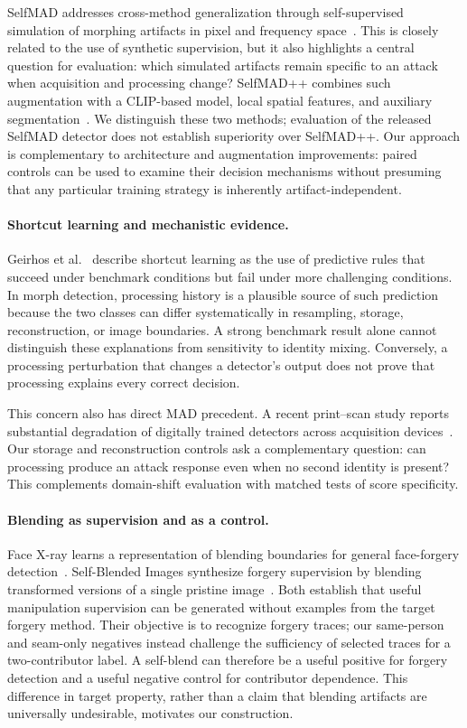 SelfMAD addresses cross-method generalization through self-supervised simulation of morphing artifacts in pixel and frequency space~\cite{ivanovska2025selfmad}. This is closely related to the use of synthetic supervision, but it also highlights a central question for evaluation: which simulated artifacts remain specific to an attack when acquisition and processing change? SelfMAD++ combines such augmentation with a CLIP-based model, local spatial features, and auxiliary segmentation~\cite{ivanovska2026selfmadpp}. We distinguish these two methods; evaluation of the released SelfMAD detector does not establish superiority over SelfMAD++. Our approach is complementary to architecture and augmentation improvements: paired controls can be used to examine their decision mechanisms without presuming that any particular training strategy is inherently artifact-independent.

\paragraph{Shortcut learning and mechanistic evidence.}
Geirhos et al.~\cite{geirhos2020shortcut} describe shortcut learning as the use of predictive rules that succeed under benchmark conditions but fail under more challenging conditions. In morph detection, processing history is a plausible source of such prediction because the two classes can differ systematically in resampling, storage, reconstruction, or image boundaries. A strong benchmark result alone cannot distinguish these explanations from sensitivity to identity mixing. Conversely, a processing perturbation that changes a detector's output does not prove that processing explains every correct decision.

This concern also has direct MAD precedent. A recent print--scan study reports substantial degradation of digitally trained detectors across acquisition devices~\cite{paulo2026printed}. Our storage and reconstruction controls ask a complementary question: can processing produce an attack response even when no second identity is present? This complements domain-shift evaluation with matched tests of score specificity.

\paragraph{Blending as supervision and as a control.}
Face X-ray learns a representation of blending boundaries for general face-forgery detection~\cite{li2020facexray}. Self-Blended Images synthesize forgery supervision by blending transformed versions of a single pristine image~\cite{shiohara2022sbi}. Both establish that useful manipulation supervision can be generated without examples from the target forgery method. Their objective is to recognize forgery traces; our same-person and seam-only negatives instead challenge the sufficiency of selected traces for a two-contributor label. A self-blend can therefore be a useful positive for forgery detection and a useful negative control for contributor dependence. This difference in target property, rather than a claim that blending artifacts are universally undesirable, motivates our construction.

